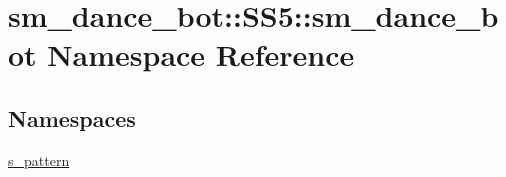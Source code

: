 \hypertarget{namespacesm__dance__bot_1_1SS5_1_1sm__dance__bot}{}\section{sm\+\_\+dance\+\_\+bot\+:\+:S\+S5\+:\+:sm\+\_\+dance\+\_\+bot Namespace Reference}
\label{namespacesm__dance__bot_1_1SS5_1_1sm__dance__bot}
\subsection*{Namespaces}
\begin{DoxyCompactItemize}
\item 
 \hyperlink{namespacesm__dance__bot_1_1SS5_1_1sm__dance__bot_1_1s__pattern}{s\+\_\+pattern}
\end{DoxyCompactItemize}
